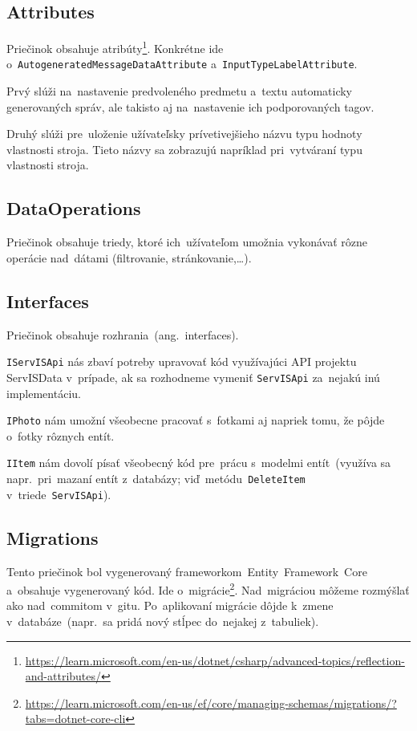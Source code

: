\subsection{Attributes}

Priečinok obsahuje atribúty\footnote{\url{https://learn.microsoft.com/en-us/dotnet/csharp/advanced-topics/reflection-and-attributes/}}. Konkrétne ide\\o~\verb|AutogeneratedMessageDataAttribute| a~\verb|InputTypeLabelAttribute|.

Prvý slúži na~nastavenie predvoleného predmetu a~textu automaticky generovaných správ, ale takisto aj na~nastavenie ich podporovaných tagov.

Druhý slúži pre~uloženie užívateľsky prívetivejšieho názvu typu hodnoty vlastnosti stroja. Tieto názvy sa zobrazujú napríklad pri~vytváraní typu vlastnosti stroja.

\subsection{DataOperations}
\label{dataoperations}

Priečinok obsahuje triedy, ktoré ich~užívateľom umožnia vykonávať rôzne operácie nad~dátami (filtrovanie, stránkovanie,\dots).

\subsection{Interfaces}

Priečinok obsahuje rozhrania~(ang.~interfaces).

\verb|IServISApi| nás zbaví potreby upravovať kód využívajúci API projektu ServISData v~prípade, ak sa rozhodneme vymeniť \verb|ServISApi| za~nejakú inú implementáciu.

\verb|IPhoto| nám umožní všeobecne pracovať s~fotkami aj napriek tomu, že pôjde o~fotky rôznych entít.

\verb|IItem| nám dovolí písať všeobecný kód pre~prácu s~modelmi entít~(využíva sa napr.~pri~mazaní entít z~databázy; viď~metódu~\verb|DeleteItem| v~triede~\verb|ServISApi|).

\subsection{Migrations}

Tento priečinok bol vygenerovaný frameworkom~Entity~Framework~Core a~obsahuje vygenerovaný kód. Ide o~migrácie\footnote{\url{https://learn.microsoft.com/en-us/ef/core/managing-schemas/migrations/?tabs=dotnet-core-cli}}. Nad~migráciou môžeme rozmýšlať ako nad~commitom v~gitu. Po~aplikovaní migrácie dôjde k~zmene v~databáze~(napr.~sa pridá nový stĺpec do~nejakej z~tabuliek).

